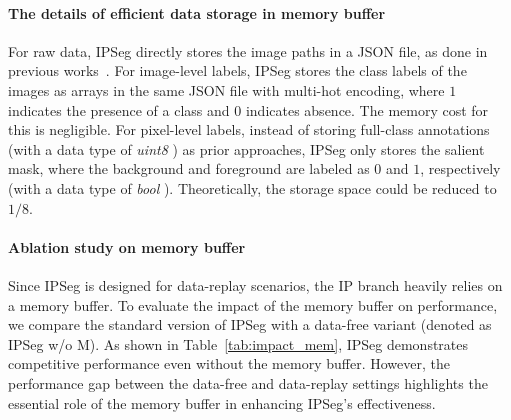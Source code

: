 \paragraph{The details of efficient data storage in memory buffer}  

For raw data, IPSeg directly stores the image paths in a JSON file, as done in previous works~\citep{SSUL_cha2021ssul,microseg_zhang2022mining,coinseg_zhang2023coinseg}. For image-level labels, IPSeg stores the class labels of the images as arrays in the same JSON file with multi-hot encoding, where $1$ indicates the presence of a class and $0$ indicates absence. The memory cost for this is negligible. For pixel-level labels, instead of storing full-class annotations (with a data type of \textit{uint8} ) as prior approaches, IPSeg only stores the salient mask, where the background and foreground are labeled as $0$ and $1$, respectively (with a data type of \textit{bool} ). Theoretically, the storage space could be reduced to $1/8$. 
   


\paragraph{Ablation study on memory buffer} Since IPSeg is designed for data-replay scenarios, the IP branch heavily relies on a memory buffer. To evaluate the impact of the memory buffer on performance, we compare the standard version of IPSeg with a data-free variant (denoted as IPSeg w/o M). As shown in Table~\ref{tab:impact_mem}, IPSeg demonstrates competitive performance even without the memory buffer. However, the performance gap between the data-free and data-replay settings highlights the essential role of the memory buffer in enhancing IPSeg's effectiveness.

